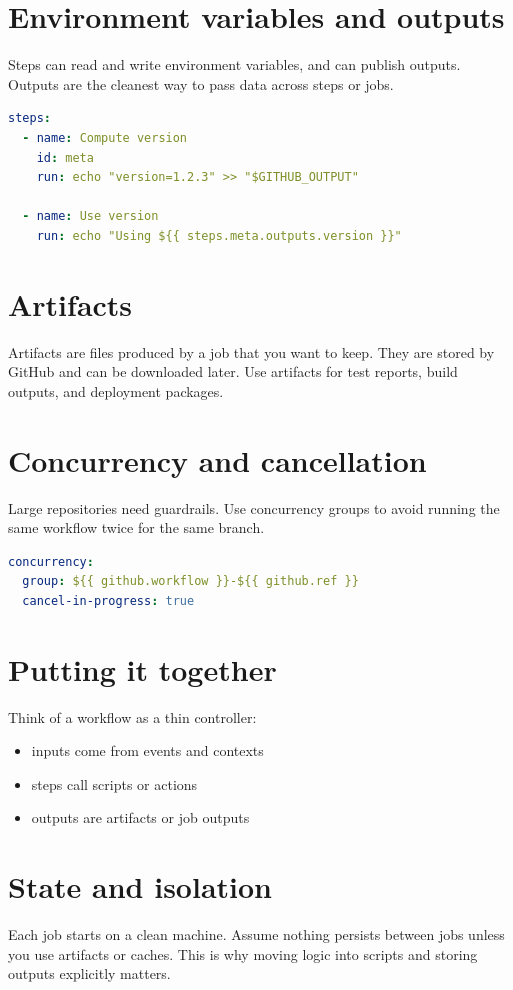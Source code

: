 \section{Environment variables and outputs}
Steps can read and write environment variables, and can publish outputs.
Outputs are the cleanest way to pass data across steps or jobs.

\begin{lstlisting}[language=YAML]
steps:
  - name: Compute version
    id: meta
    run: echo "version=1.2.3" >> "$GITHUB_OUTPUT"

  - name: Use version
    run: echo "Using ${{ steps.meta.outputs.version }}"
\end{lstlisting}

\section{Artifacts}
Artifacts are files produced by a job that you want to keep.
They are stored by GitHub and can be downloaded later.
Use artifacts for test reports, build outputs, and deployment packages.

\section{Concurrency and cancellation}
Large repositories need guardrails.
Use concurrency groups to avoid running the same workflow twice for the same branch.

\begin{lstlisting}[language=YAML]
concurrency:
  group: ${{ github.workflow }}-${{ github.ref }}
  cancel-in-progress: true
\end{lstlisting}

\section{Putting it together}
Think of a workflow as a thin controller:
\begin{itemize}[nosep]
  \item inputs come from events and contexts
  \item steps call scripts or actions
  \item outputs are artifacts or job outputs
\end{itemize}

\section{State and isolation}
Each job starts on a clean machine.
Assume nothing persists between jobs unless you use artifacts or caches.
This is why moving logic into scripts and storing outputs explicitly matters.

